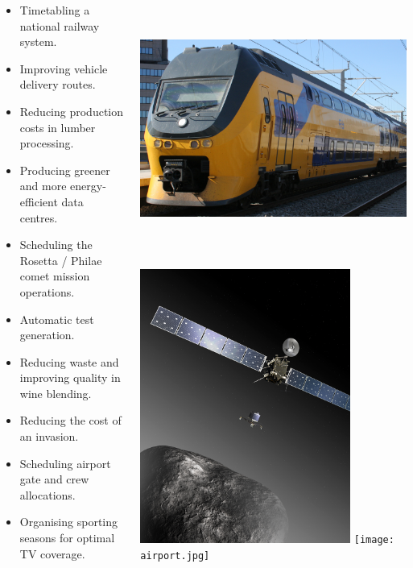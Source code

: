 \documentclass[a0paper]{tikzposter}
\begin{document}
\begin{columns}
{\begin{itemize}
    \item Timetabling a national railway system.
    \item Improving vehicle delivery routes.
    \item Reducing production costs in lumber processing.
    \item Producing greener and more energy-efficient data centres.
    \item Scheduling the Rosetta / Philae comet mission operations.
    \item Automatic test generation.
    \item Reducing waste and improving quality in wine blending.
    \item Reducing the cost of an invasion.
    \item Scheduling airport gate and crew allocations.
    \item Organising sporting seasons for optimal TV coverage.
\end{itemize}

\vspace{0.7em}

\begin{center}
    \includegraphics*[keepaspectratio=true,height=9cm]{train.jpg}
    \hfill
    \includegraphics*[keepaspectratio=true,height=9cm]{comet.jpg}
    \hfill
    \texttt{[image: airport.jpg]}
\end{center}

}
\end{columns}
\end{document}
